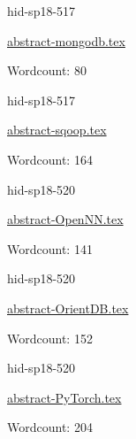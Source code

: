 

\begin{IU}

hid-sp18-517

\href{https://github.com/cloudmesh-community/hid-sp18-517/blob/master//technology/abstract-mongodb.tex}{abstract-mongodb.tex}

 

Wordcount: 80

\end{IU}



\begin{IU}

hid-sp18-517

\href{https://github.com/cloudmesh-community/hid-sp18-517/blob/master//technology/abstract-sqoop.tex}{abstract-sqoop.tex}

 

Wordcount: 164

\end{IU}



\begin{IU}

hid-sp18-520

\href{https://github.com/cloudmesh-community/hid-sp18-520/blob/master//technology/abstract-OpenNN.tex}{abstract-OpenNN.tex}

 

Wordcount: 141

\end{IU}



\begin{IU}

hid-sp18-520

\href{https://github.com/cloudmesh-community/hid-sp18-520/blob/master//technology/abstract-OrientDB.tex}{abstract-OrientDB.tex}

 

Wordcount: 152

\end{IU}



\begin{IU}

hid-sp18-520

\href{https://github.com/cloudmesh-community/hid-sp18-520/blob/master//technology/abstract-PyTorch.tex}{abstract-PyTorch.tex}

 

Wordcount: 204

\end{IU}


